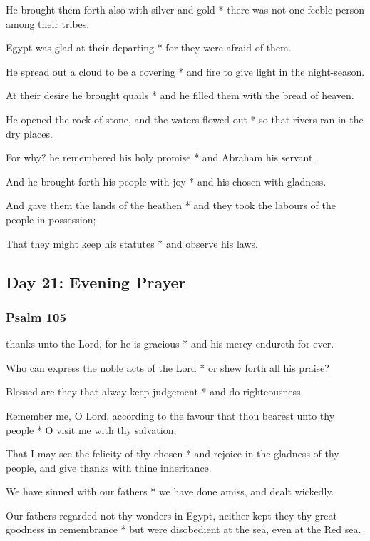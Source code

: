He brought them forth also with silver and gold * there was not one feeble person among their tribes.

Egypt was glad at their departing * for they were afraid of them.

He spread out a cloud to be a covering * and fire to give light in the night-season.

At their desire he brought quails * and he filled them with the bread of heaven.

He opened the rock of stone, and the waters flowed out * so that rivers ran in the dry places.

For why? he remembered his holy promise * and Abraham his servant.

And he brought forth his people with joy * and his chosen with gladness.

And gave them the lands of the heathen * and they took the labours of the people in possession;

That they might keep his statutes * and observe his laws.

\subsection{Day 21: Evening Prayer}

\subsubsection{Psalm 105}


 thanks unto the Lord, for he is gracious * and his mercy endureth for ever.

Who can express the noble acts of the Lord * or shew forth all his praise?

Blessed are they that alway keep judgement * and do righteousness.

Remember me, O Lord, according to the favour that thou bearest unto thy people * O visit me with thy salvation;

That I may see the felicity of thy chosen * and rejoice in the gladness of thy people, and give thanks with thine inheritance.

We have sinned with our fathers * we have done amiss, and dealt wickedly.

Our fathers regarded not thy wonders in Egypt, neither kept they thy great goodness in remembrance * but were disobedient at the sea, even at the Red sea.

